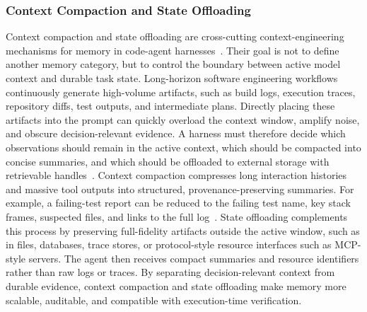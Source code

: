 \documentclass{llmxive}
\begin{document}
\subsubsection{Context Compaction and State Offloading}
Context compaction and state offloading are cross-cutting context-engineering mechanisms for memory in code-agent harnesses~\cite{liu2026dive}. Their goal is not to define another memory category, but to control the boundary between active model context and durable task state. Long-horizon software engineering workflows continuously generate high-volume artifacts, such as build logs, execution traces, repository diffs, test outputs, and intermediate plans. Directly placing these artifacts into the prompt can quickly overload the context window, amplify noise, and obscure decision-relevant evidence. A harness must therefore decide which observations should remain in the active context, which should be compacted into concise summaries, and which should be offloaded to external storage with retrievable handles~\cite{zhou2026externalization}.
Context compaction compresses long interaction histories and massive tool outputs into structured, provenance-preserving summaries. For example, a failing-test report can be reduced to the failing test name, key stack frames, suspected files, and links to the full log~\cite{jia2026compressing,sun2025scaling,shi2025longcodezip,wang2026swe}. State offloading complements this process by preserving full-fidelity artifacts outside the active window, such as in files, databases, trace stores, or protocol-style resource interfaces such as MCP-style servers. The agent then receives compact summaries and resource identifiers rather than raw logs or traces. By separating decision-relevant context from durable evidence, context compaction and state offloading make memory more scalable, auditable, and compatible with execution-time verification.
\end{document}
